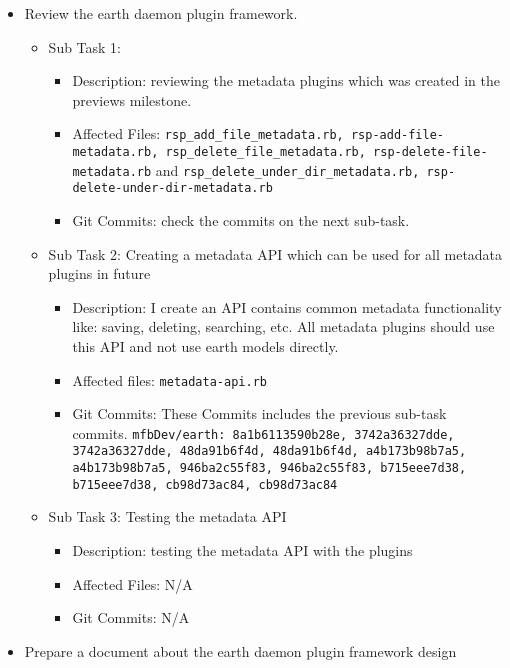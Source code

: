 \documentclass{article}
\begin{document}
\begin{itemize}
    \item Review the earth daemon plugin framework.
        \begin{itemize}
            \item Sub Task 1:
                \begin{itemize}
                    \item Description: reviewing the metadata plugins which was created in the previews milestone.
                    \item Affected Files: \texttt{rsp\_add\_file\_metadata.rb, rsp-add-file-metadata.rb, rsp\_delete\_file\_metadata.rb, rsp-delete-file-metadata.rb} and \texttt{rsp\_delete\_under\_dir\_metadata.rb, rsp-delete-under-dir-metadata.rb}
                    \item Git Commits: check the commits on the next sub-task.
                \end{itemize}
            \item Sub Task 2: Creating a metadata API which can be used for all metadata plugins in future
                \begin{itemize}
                    \item Description: I create an API contains common metadata functionality like: saving, deleting, searching, etc. All metadata plugins should use this API and not use earth models directly. 
                    \item Affected files: \texttt{metadata-api.rb}
                    \item Git Commits: These Commits includes the previous sub-task commits. 
\texttt{mfbDev/earth: 8a1b6113590b28e, 3742a36327dde, 3742a36327dde, 48da91b6f4d, 48da91b6f4d, a4b173b98b7a5, a4b173b98b7a5, 946ba2c55f83, 946ba2c55f83, b715eee7d38, b715eee7d38, cb98d73ac84, cb98d73ac84}
                \end{itemize}
            \item Sub Task 3: Testing the metadata API
                \begin{itemize}
                    \item Description: testing the metadata API with the plugins  
                    \item Affected Files: N/A
                    \item Git Commits: N/A
                \end{itemize}
        \end{itemize} 
\newpage     
    \item Prepare a document about the earth daemon plugin framework design

\end{itemize}
\end{document}
